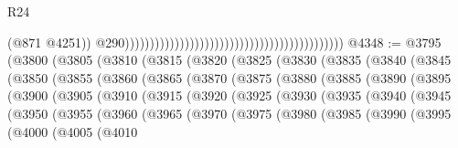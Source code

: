 \begin{lexlean}{R24}
\begin{coremodule}
{{{{{{{{{{{{{{{{{{{{{{{{{{{{{{{{{{{{{{{{{{{{{{{{{{{{{{{{{{{{{{{{{{{{{{{{{{{{{{{{{{{{{{{{{{{{{{{{{{{{{{{{{{{{{{{{{{{{{{{{{{{{{{{{{{{{{{{{{{{{{{{{{{{{{{{{{{{{{{{{{{{{{{{{{{{{{{{{{{{{{{{{{{{{{{{{{{{                                                                                              (@871
                                                                                                @4251))
                                                                                            @290))))))))))))))))))))))))))))))))))))))))))))
@4348 := @3795
    (@3800
      (@3805
        (@3810
          (@3815
            (@3820
              (@3825
                (@3830
                  (@3835
                    (@3840
                      (@3845
                        (@3850
                          (@3855
                            (@3860
                              (@3865
                                (@3870
                                  (@3875
                                    (@3880
                                      (@3885
                                        (@3890
                                          (@3895
                                            (@3900
                                              (@3905
                                                (@3910
                                                  (@3915
                                                    (@3920
                                                      (@3925
                                                        (@3930
                                                          (@3935
                                                            (@3940
                                                              (@3945
                                                                (@3950
                                                                  (@3955
                                                                    (@3960
                                                                      (@3965
                                                                        (@3970
                                                                          (@3975
                                                                            (@3980
                                                                              (@3985
                                                                                (@3990
                                                                                  (@3995
                                                                                    (@4000
                                                                                      (@4005
                                                                                        (@4010
}}}}}}}}}}}}}}}}}}}}}}}}}}}}}}}}}}}}}}}}}}}}}}}}}}}}}}}}}}}}}}}}}}}}}}}}}}}}}}}}}}}}}}}}}}}}}}}}}}}}}}}}}}}}}}}}}}}}}}}}}}}}}}}}}}}}}}}}}}}}}}}}}}}}}}}}}}}}}}}}}}}}}}}}}}}}}}}}}}}}}}}}}}}}}}}}}}}
\end{coremodule}
\end{lexlean}
